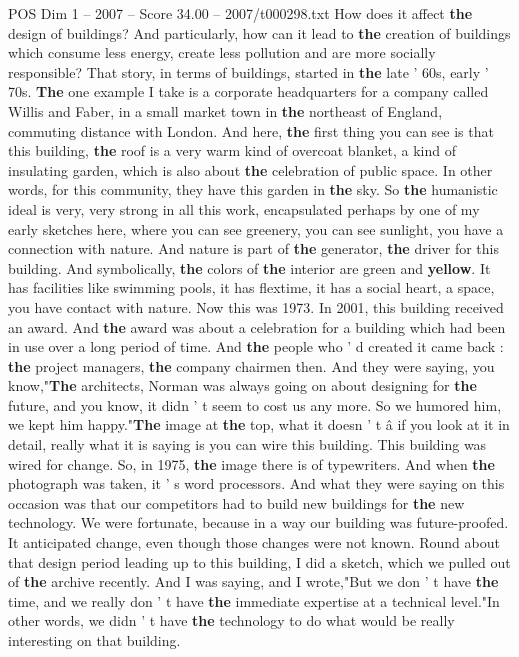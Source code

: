 \begin{textsample}{POS Dim 1 – 2007 – Score 34.00 – 2007/t000298.txt}
How does it affect \textbf{the} design of buildings?
And particularly, how can it lead to \textbf{the} creation of buildings which consume less energy, create less pollution and are more socially responsible?
That story, in terms of buildings, started in \textbf{the} late ' 60s, early ' 70s. \textbf{The} one example I take is a corporate headquarters for a company called Willis and Faber, in a small market town in \textbf{the} northeast of England, commuting distance with London.
And here, \textbf{the} first thing you can see is that this building, \textbf{the} roof is a very warm kind of overcoat blanket, a kind of insulating garden, which is also about \textbf{the} celebration of public space.
In other words, for this community, they have this garden in \textbf{the} sky.
So \textbf{the} humanistic ideal is very, very strong in all this work, encapsulated perhaps by one of my early sketches here, where you can see greenery, you can see sunlight, you have a connection with nature.
And nature is part of \textbf{the} generator, \textbf{the} driver for this building.
And symbolically, \textbf{the} colors of \textbf{the} interior are green and \textbf{yellow}.
It has facilities like swimming pools, it has flextime, it has a social heart, a space, you have contact with nature.
Now this was 1973.
In 2001, this building received an award.
And \textbf{the} award was about a celebration for a building which had been in use over a long period of time.
And \textbf{the} people who ' d created it came back : \textbf{the} project managers, \textbf{the} company chairmen then.
And they were saying, you know,"\textbf{The} architects, Norman was always going on about designing for \textbf{the} future, and you know, it didn ' t seem to cost us any more.
So we humored him, we kept him happy."\textbf{The} image at \textbf{the} top, what it doesn ' t â if you look at it in detail, really what it is saying is you can wire this building.
This building was wired for change.
So, in 1975, \textbf{the} image there is of typewriters.
And when \textbf{the} photograph was taken, it ' s word processors.
And what they were saying on this occasion was that our competitors had to build new buildings for \textbf{the} new technology.
We were fortunate, because in a way our building was future-proofed.
It anticipated change, even though those changes were not known.
Round about that design period leading up to this building, I did a sketch, which we pulled out of \textbf{the} archive recently.
And I was saying, and I wrote,"But we don ' t have \textbf{the} time, and we really don ' t have \textbf{the} immediate expertise at a technical level."In other words, we didn ' t have \textbf{the} technology to do what would be really interesting on that building.

\end{textsample}
